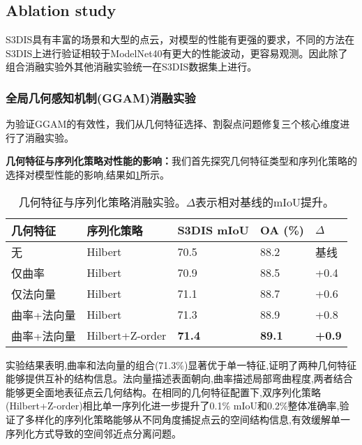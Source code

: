 \documentclass[preprint,12pt]{elsarticle}
\begin{document}
\subsection{Ablation study}
S3DIS具有丰富的场景和大型的点云，对模型的性能有更强的要求，不同的方法在S3DIS上进行验证相较于ModelNet40有更大的性能波动，更容易观测。因此除了组合消融实验外其他消融实验统一在S3DIS数据集上进行。


\subsubsection{全局几何感知机制(GGAM)消融实验}

为验证GGAM的有效性，我们从几何特征选择、割裂点问题修复三个核心维度进行了消融实验。

\textbf{几何特征与序列化策略对性能的影响：}我们首先探究几何特征类型和序列化策略的选择对模型性能的影响,结果如\cref{tab:ggam_feature_serialization}所示。

\begin{table}[htbp!]
	\centering
	\caption{几何特征与序列化策略消融实验。$\Delta$表示相对基线的mIoU提升。}
	\label{tab:ggam_feature_serialization}
	\begin{tabular}{@{}lllll@{}}
		\toprule
		几何特征 & 序列化策略 & S3DIS mIoU & OA (\%) & $\Delta$ \\ 
		\midrule
		无 & Hilbert & 70.5 & 88.2 & 基线 \\
		\midrule
		仅曲率 & Hilbert & 70.9 & 88.5 & +0.4 \\
		仅法向量 & Hilbert & 71.1 & 88.7 & +0.6 \\
		曲率+法向量 & Hilbert & 71.3 & 88.9 & +0.8 \\
		\midrule
		曲率+法向量 & Hilbert+Z-order & \textbf{71.4} & \textbf{89.1} & \textbf{+0.9} \\
		\bottomrule
	\end{tabular}
\end{table}

实验结果表明,曲率和法向量的组合(71.3\%)显著优于单一特征,证明了两种几何特征能够提供互补的结构信息。法向量描述表面朝向,曲率描述局部弯曲程度,两者结合能够更全面地表征点云几何结构。在相同的几何特征配置下,双序列化策略(Hilbert+Z-order)相比单一序列化进一步提升了0.1\% mIoU和0.2\%整体准确率,验证了多样化的序列化策略能够从不同角度捕捉点云的空间结构信息,有效缓解单一序列化方式导致的空间邻近点分离问题。
\end{document}
